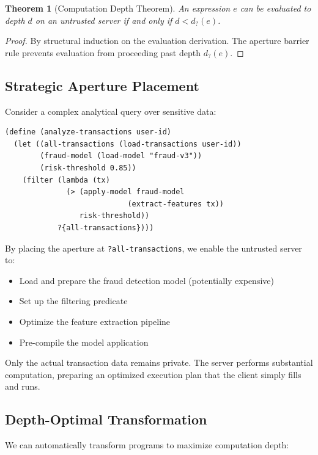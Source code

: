 \documentclass[12pt]{article}
\newtheorem{theorem}{Theorem}
\begin{document}
\begin{theorem}[Computation Depth Theorem]
An expression $e$ can be evaluated to depth $d$ on an untrusted server if and only if $d < d_?(e)$.
\end{theorem}

\begin{proof}
By structural induction on the evaluation derivation. The aperture barrier rule prevents evaluation from proceeding past depth $d_?(e)$.
\end{proof}

\subsection{Strategic Aperture Placement}

Consider a complex analytical query over sensitive data:

\begin{lstlisting}
(define (analyze-transactions user-id)
  (let ((all-transactions (load-transactions user-id))
        (fraud-model (load-model "fraud-v3"))
        (risk-threshold 0.85))
    (filter (lambda (tx)
              (> (apply-model fraud-model 
                            (extract-features tx))
                 risk-threshold))
            ?{all-transactions})))
\end{lstlisting}

By placing the aperture at \texttt{?all-transactions}, we enable the untrusted server to:
\begin{itemize}
    \item Load and prepare the fraud detection model (potentially expensive)
    \item Set up the filtering predicate
    \item Optimize the feature extraction pipeline
    \item Pre-compile the model application
\end{itemize}

Only the actual transaction data remains private. The server performs substantial computation, preparing an optimized execution plan that the client simply fills and runs.

\subsection{Depth-Optimal Transformation}

We can automatically transform programs to maximize computation depth:
\end{document}
